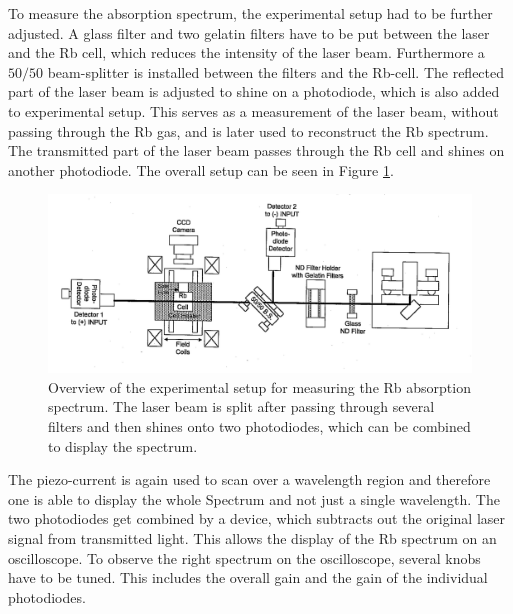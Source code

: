 To  measure the absorption spectrum, the experimental setup had to be further adjusted. A glass filter and two gelatin filters have to be put between the laser and the Rb cell, which reduces the intensity of the laser beam. 
Furthermore a $50/50$ beam-splitter is installed between the filters and the Rb-cell. The reflected part of the laser beam is adjusted to shine on a photodiode, which is also added to experimental setup. This serves as a measurement of the laser beam, without passing through the Rb gas, and is later used to reconstruct the Rb spectrum.
The transmitted part of the laser beam passes through the Rb cell and shines on another photodiode. The overall setup can be seen in Figure \ref{fig:exp3}.
\begin{figure}
    \centering
    \includegraphics[width = \linewidth]{Bilder/exp3.png}
    \caption{ Overview of the experimental setup for measuring the Rb absorption spectrum. The laser beam is split after passing through several filters and then shines onto two photodiodes, which can be combined to display the spectrum.\cite{sample} }
    \label{fig:exp3}
\end{figure}
The piezo-current is again used to scan over a wavelength region and therefore one is able to display the whole Spectrum and not just a single wavelength.
The two photodiodes get combined by a device, which subtracts out the original laser signal from transmitted light. This allows the display of the Rb spectrum on an oscilloscope. To observe the right spectrum on the oscilloscope, several knobs have to be tuned. This includes the overall gain and the gain of the individual photodiodes.

